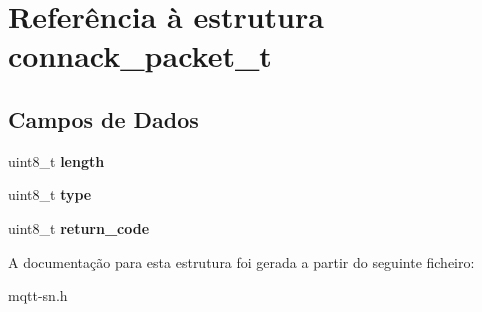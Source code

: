 \hypertarget{structconnack__packet__t}{\section{Referência à estrutura connack\+\_\+packet\+\_\+t}
\label{structconnack__packet__t}
}
\subsection*{Campos de Dados}
\begin{DoxyCompactItemize}
\item 
\hypertarget{structconnack__packet__t_ab2b3adeb2a67e656ff030b56727fd0ac}{uint8\+\_\+t {\bfseries length}}\label{structconnack__packet__t_ab2b3adeb2a67e656ff030b56727fd0ac}

\item 
\hypertarget{structconnack__packet__t_a1d127017fb298b889f4ba24752d08b8e}{uint8\+\_\+t {\bfseries type}}\label{structconnack__packet__t_a1d127017fb298b889f4ba24752d08b8e}

\item 
\hypertarget{structconnack__packet__t_aa72e4a685c5a553897adf56e0e60a61e}{uint8\+\_\+t {\bfseries return\+\_\+code}}\label{structconnack__packet__t_aa72e4a685c5a553897adf56e0e60a61e}

\end{DoxyCompactItemize}


A documentação para esta estrutura foi gerada a partir do seguinte ficheiro\+:\begin{DoxyCompactItemize}
\item 
mqtt-\/sn.\+h\end{DoxyCompactItemize}
